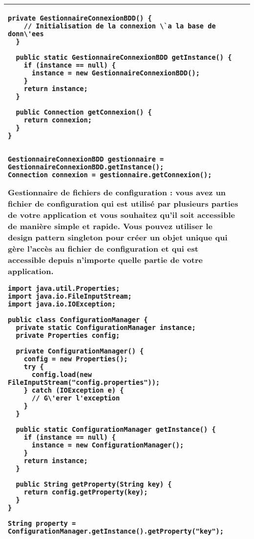 \begin{table}[H]
\begin{adjustbox}{max width=\textwidth}
\begin{tabular}{l|p{\textwidth}}
\begin{minipage}[tl]{0.5\textwidth}
\begin{minipage}[b]{1\textwidth}
\begin{lstlisting}[style=monstyle]
  private GestionnaireConnexionBDD() {
    // Initialisation de la connexion \`a la base de donn\'ees
  }

  public static GestionnaireConnexionBDD getInstance() {
    if (instance == null) {
      instance = new GestionnaireConnexionBDD();
    }
    return instance;
  }

  public Connection getConnexion() {
    return connexion;
  }
}


GestionnaireConnexionBDD gestionnaire = GestionnaireConnexionBDD.getInstance();
Connection connexion = gestionnaire.getConnexion();

\end{lstlisting} 
\end{minipage}
\end{minipage}
\hspace{6mm}
\begin{minipage}[tr]{0.5\textwidth}
\begin{minipage}[t]{1\textwidth}
Gestionnaire de fichiers de configuration : vous avez un fichier de configuration qui est utilisé par plusieurs parties de votre application et vous souhaitez qu'il soit accessible de manière simple et rapide. Vous pouvez utiliser le design pattern singleton pour créer un objet unique qui gère l'accès au fichier de configuration et qui est accessible depuis n'importe quelle partie de votre application.
\end{minipage}
\begin{minipage}[b]{1\textwidth}
\begin{lstlisting}[style=monstyle]
import java.util.Properties;
import java.io.FileInputStream;
import java.io.IOException;

public class ConfigurationManager {
  private static ConfigurationManager instance;
  private Properties config;

  private ConfigurationManager() {
    config = new Properties();
    try {
      config.load(new FileInputStream("config.properties"));
    } catch (IOException e) {
      // G\'erer l'exception
    }
  }

  public static ConfigurationManager getInstance() {
    if (instance == null) {
      instance = new ConfigurationManager();
    }
    return instance;
  }

  public String getProperty(String key) {
    return config.getProperty(key);
  }
}

String property = ConfigurationManager.getInstance().getProperty("key");


\end{lstlisting}
\end{minipage}
\end{minipage}
\\
\bottomrule
\end{tabular}
\end{adjustbox}
\end{table}